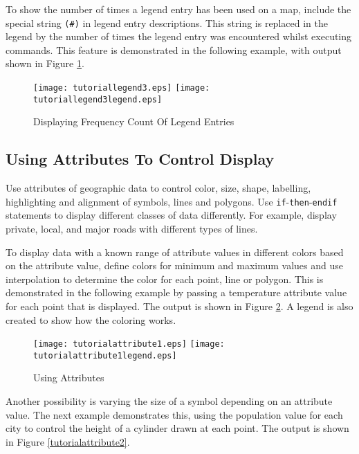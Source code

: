 To show the number of times a legend entry has been used on
a map, include the special string \texttt{(\#)} in legend entry descriptions.
This string is replaced in the legend by the number of times the legend entry
was encountered whilst executing commands.
This feature is demonstrated in the following example,
with output shown in 
Figure \ref{tutoriallegend3}.



\begin{figure}[htb]
\texttt{[image: tutoriallegend3.eps]}
\texttt{[image: tutoriallegend3legend.eps]}
\caption{Displaying Frequency Count Of Legend Entries}
\label{tutoriallegend3}
\end{figure}

\subsection{Using Attributes To Control Display}

Use attributes of geographic data to control
color, size, shape, labelling, highlighting and alignment of symbols, lines
and polygons.
Use \texttt{if}-\texttt{then}-\texttt{endif}
statements to display different classes of data
differently.  For example, display private, local, and major roads
with different types of lines.

To display data with a known range of attribute values in different
colors based on the attribute value, define colors for minimum and
maximum values and use interpolation to determine the color for
each point, line or polygon.  This is demonstrated in the following
example by passing a temperature attribute value for each point
that is displayed.  The output is shown in Figure \ref{tutorialattribute1}.
A legend is also created to show how the coloring works.



\begin{figure}[htb]
\texttt{[image: tutorialattribute1.eps]}
\texttt{[image: tutorialattribute1legend.eps]}
\caption{Using Attributes}
\label{tutorialattribute1}
\end{figure}

Another possibility is varying the size of a symbol depending
on an attribute value.  The next example demonstrates this, using the
population value for each city to control the height of a
cylinder drawn at each point.
The output is shown in Figure \ref{tutorialattribute2}.

